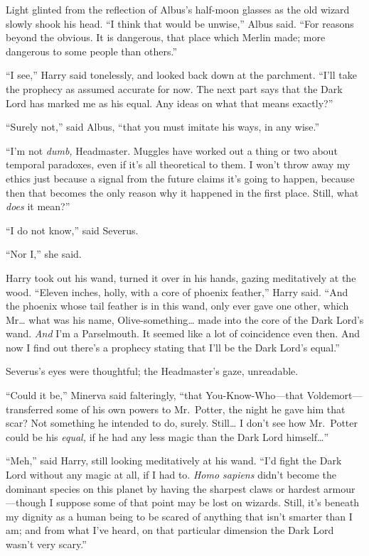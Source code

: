 Light glinted from the reflection of Albus's half-moon glasses as the
old wizard slowly shook his head. ``I think that would be unwise,''
Albus said. ``For reasons beyond the obvious. It is dangerous, that
place which Merlin made; more dangerous to some people than others.''

``I see,'' Harry said tonelessly, and looked back down at the parchment.
``I'll take the prophecy as assumed accurate for now. The next part says
that the Dark Lord has marked me as his equal. Any ideas on what that
means exactly?''

``Surely not,'' said Albus, ``that you must imitate his ways, in any
wise.''

``I'm not \emph{dumb,} Headmaster. Muggles have worked out a thing or
two about temporal paradoxes, even if it's all theoretical to them. I
won't throw away my ethics just because a signal from the future claims
it's going to happen, because then that becomes the only reason why it
happened in the first place. Still, what \emph{does} it mean?''

``I do not know,'' said Severus.

``Nor I,'' she said.

Harry took out his wand, turned it over in his hands, gazing
meditatively at the wood. ``Eleven inches, holly, with a core of phoenix
feather,'' Harry said. ``And the phoenix whose tail feather is in this
wand, only ever gave one other, which Mr\ldots{} what was his name,
Olive-something\ldots{} made into the core of the Dark Lord's wand.
\emph{And} I'm a Parselmouth. It seemed like a lot of coincidence even
then. And now I find out there's a prophecy stating that I'll be the
Dark Lord's equal.''

Severus's eyes were thoughtful; the Headmaster's gaze, unreadable.

``Could it be,'' Minerva said falteringly, ``that You-Know-Who---that
Voldemort---transferred some of his own powers to Mr.~Potter, the night
he gave him that scar? Not something he intended to do, surely.
Still\ldots{} I don't see how Mr.~Potter could be his \emph{equal,} if
he had any less magic than the Dark Lord himself\ldots{}''

``Meh,'' said Harry, still looking meditatively at his wand. ``I'd fight
the Dark Lord without any magic at all, if I had to. \emph{Homo sapiens}
didn't become the dominant species on this planet by having the sharpest
claws or hardest armour---though I suppose some of that point may be
lost on wizards. Still, it's beneath my dignity as a human being to be
scared of anything that isn't smarter than I am; and from what I've
heard, on that particular dimension the Dark Lord wasn't very scary.''

